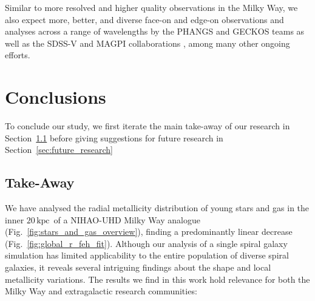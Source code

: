 \documentclass[twocolumn,apj,numberedappendix,appendixfloats]{openjournal}
\newcommand{\nihaoRmax}{$20\,\mathrm{kpc}$}
\begin{document}
\begin{CJK*}{UTF8}{gbsn}
Similar to more resolved and higher quality observations in the Milky Way, we also expect more, better, and diverse face-on and edge-on observations and analyses across a range of wavelengths by the PHANGS and GECKOS teams \citep{Kreckel2019, Kreckel2020, GECKOS2023} as well as the SDSS-V and MAGPI collaborations \citep{Kollmeier2017, MAGPI2021, Mun2024, Chen2024}, among many other ongoing efforts.

\section{Conclusions}
\label{sec:conc}

To conclude our study, we first iterate the main take-away of our research in Section~\ref{sec:take_away} before giving suggestions for future research in Section~\ref{sec:future_research}

\subsection{Take-Away} \label{sec:take_away}

We have analysed the radial metallicity distribution of young stars and gas in the inner \nihaoRmax\ of a NIHAO-UHD Milky Way analogue (Fig.~\ref{fig:stars_and_gas_overview}), finding a predominantly linear decrease (Fig.~\ref{fig:global_r_feh_fit}). Although our analysis of a single spiral galaxy simulation has limited applicability to the entire population of diverse spiral galaxies, it reveals several intriguing findings about the shape and local metallicity variations. The results we find in this work hold relevance for both the Milky Way and extragalactic research communities:


\end{CJK*}
\end{document}
